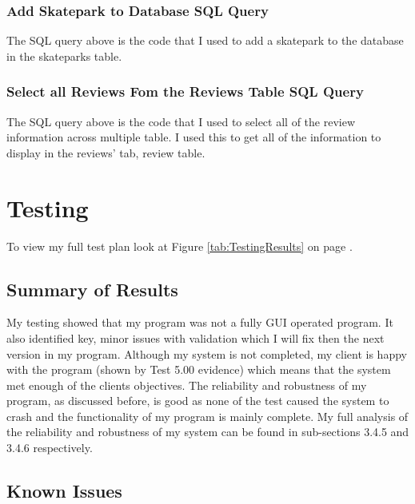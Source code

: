 \begin{landscape}
\subsubsection{Add Skatepark to Database SQL Query}

The SQL query above is the code that I used to add a skatepark to the database in the skateparks table. 



\subsubsection{Select all Reviews Fom the Reviews Table SQL Query}

The SQL query above is the code that I used to select all of the review information across multiple table. I used this to get all of the information to display in the reviews' tab, review table. 

\end{landscape}

\section {Testing}

To view my full test plan look at Figure \ref{tab:TestingResults} on page \pageref{tab:TestingResults}.

\subsection{Summary of Results}

My testing showed that my program was not a fully GUI operated program. It also identified key, minor issues with validation which I will fix then the next version in my program. Although my system is not completed, my client is happy with the program (shown by Test 5.00 evidence) which means that the system met enough of the clients objectives. The reliability and robustness of my program, as discussed before, is good as none of the test caused the system to crash and the functionality of my program is mainly complete. My full analysis of the reliability and robustness of my system can be found in sub-sections 3.4.5 and 3.4.6 respectively.

\subsection{Known Issues}

